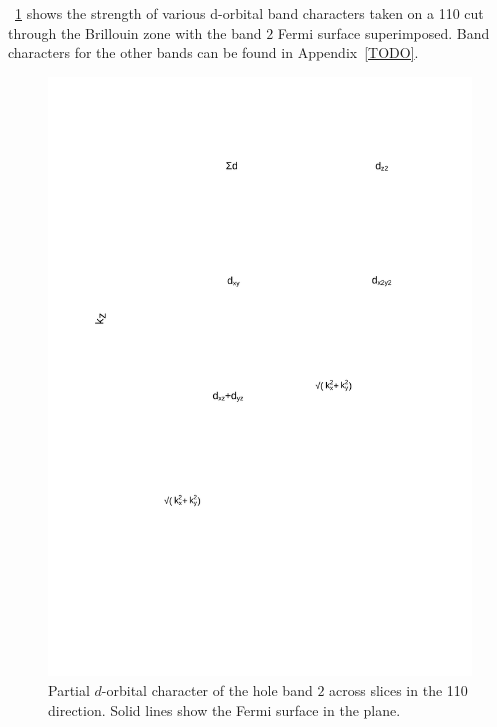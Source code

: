 \Fig~\ref{Fig:3:Band2DCharacter} shows the strength of various d-orbital band characters taken on a 110 cut through the \BaFeP Brillouin zone with the band $2$ Fermi surface superimposed. Band characters for the other bands can be found in Appendix~\ref{TODO}.
\begin{figure}[h!]
    \begin{center}
        \includegraphics[scale=0.7]{Chapter3-dHvABaFe2P2/Figures/AngleDepMeasurements/BandCharacterPlot/Band2_110Slice_BandCharacter}
        \caption{Partial $d$-orbital character of the hole band $2$ across slices in the 110 direction. Solid lines show the Fermi surface in the plane.}
        \label{Fig:3:Band2DCharacter}
    \end{center}
\end{figure}

